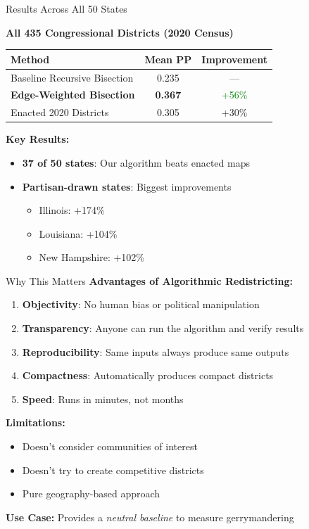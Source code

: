 \documentclass[aspectratio=169]{beamer}
\begin{document}
\begin{frame}{Results Across All 50 States}
\begin{center}
\textbf{All 435 Congressional Districts (2020 Census)}
\end{center}

\vspace{1em}
\begin{tabular}{lcc}
\toprule
\textbf{Method} & \textbf{Mean PP} & \textbf{Improvement} \\
\midrule
Baseline Recursive Bisection & 0.235 & --- \\
\textbf{Edge-Weighted Bisection} & \textbf{0.367} & \textcolor{green}{+56\%} \\
Enacted 2020 Districts & 0.305 & +30\% \\
\bottomrule
\end{tabular}

\vspace{1em}
\textbf{Key Results:}
\begin{itemize}
\item \textbf{37 of 50 states}: Our algorithm beats enacted maps
\item \textbf{Partisan-drawn states}: Biggest improvements
  \begin{itemize}
  \item Illinois: +174\%
  \item Louisiana: +104\%
  \item New Hampshire: +102\%
  \end{itemize}
\end{itemize}
\end{frame}

\begin{frame}{Why This Matters}
\textbf{Advantages of Algorithmic Redistricting:}

\begin{enumerate}
\item \textbf{Objectivity}: No human bias or political manipulation
\item \textbf{Transparency}: Anyone can run the algorithm and verify results
\item \textbf{Reproducibility}: Same inputs always produce same outputs
\item \textbf{Compactness}: Automatically produces compact districts
\item \textbf{Speed}: Runs in minutes, not months
\end{enumerate}

\vspace{1em}
\textbf{Limitations:}
\begin{itemize}
\item Doesn't consider communities of interest
\item Doesn't try to create competitive districts
\item Pure geography-based approach
\end{itemize}

\vspace{1em}
\textbf{Use Case:} Provides a \textit{neutral baseline} to measure gerrymandering
\end{frame}
\end{document}
